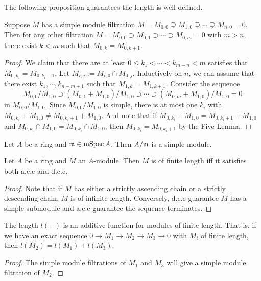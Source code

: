         The following proposition guarantees the length is well-defined.

        \begin{proposition}\label{prop: length of a module is well defined}
            Suppose $M$ has a simple module filtration $M = M_{0,0} \supsetneq M_{1,0} \supsetneq \cdots \supsetneq M_{n,0} = 0$.
            Then for any other filtration $M = M_{0,0} \supset M_{0,1} \supset \cdots \supset M_{0,m} = 0$ with $m > n$, there exist $k<m$ such that $M_{0,k} = M_{0,k+1}$.
        \end{proposition}
        \begin{proof}
            We claim that there are at least $0\leq k_1<\cdots<k_{m-n}<m$ satisfies that $M_{0,k_i} = M_{0,k_i+1}$.
            Let $M_{i,j} := M_{i,0} \cap M_{0,j}$.
            Inductively on $n$, we can assume that there exist $k_1,\cdots,k_{n-m+1}$ such that $M_{1,k} = M_{1,k+1}$.
            Consider the sequence 
            \[ M_{0,0}/M_{1,0} \supset (M_{0,1}+M_{1,0})/M_{1,0} \supset \cdots \supset (M_{0,m}+M_{1,0})/M_{1,0} = 0 \]
            in $M_{0,0}/M_{1,0}$.
            Since $M_{0,0}/M_{1,0}$ is simple, there is at most one $k_i$ with $M_{0,k_i}+M_{1,0} \neq M_{0,k_i+1}+M_{1,0}$.
            And note that if $M_{0,k_i} + M_{1,0} = M_{0,k_i+1}+M_{1,0}$ and $M_{0,k_i} \cap M_{1,0} = M_{0,k_i} \cap M_{1,0}$, then $M_{0,k_i} = M_{0,k_i+1}$ by the Five Lemma.
        \end{proof}

        \begin{example}\label{eg: A/m is a simple module}
            Let $A$ be a ring and ${\mathfrak{m}} \in \operatorname{mSpec} A$.
            Then $A/{\mathfrak{m}}$ is a simple module.
        \end{example}

        \begin{proposition}\label{prop: of finite length iff both acc and dcc}
            Let $A$ be a ring and $M$ an $A$-module.
            Then $M$ is of finite length iff it satisfies both a.c.c and d.c.c.
        \end{proposition}
        \begin{proof}
            Note that if $M$ has either a strictly ascending chain or a strictly descending chain, $M$ is of infinite length.
            Conversely, d.c.c guarantee $M$ has a simple submodule and a.c.c guarantee the sequence terminates.
        \end{proof}

        \begin{proposition}\label{prop: length is additive for modules of finite length}
            The length $l(-)$ is an additive function for modules of finite length.
            That is, if we have an exact sequence $0 \to M_1 \to M_2 \to M_3 \to 0$ with $M_i$ of finite length, then $l(M_2) = l(M_1) + l(M_3)$.
        \end{proposition}
        \begin{proof}
            The simple module filtrations of $M_1$ and $M_3$ will give a simple module filtration of $M_2$.
        \end{proof}

